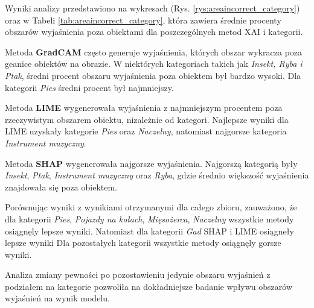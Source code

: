 Wyniki analizy  przedstawiono na wykresach (Rys. \ref{rys:areaincorrect_category}) oraz w Tabeli \ref{tab:areaincorrect_category}, która zawiera średnie procenty obszarów wyjaśnienia poza obiektami dla poszczególnych metod XAI i kategorii.

Metoda \textbf{GradCAM} często generuje wyjaśnienia, których obszar wykracza poza geanice obiektów na obrazie.
W niektórych kategoriach takich jak \textit{Insekt, Ryba i Ptak}, średni procent obszaru wyjaśnienia poza obiektem był bardzo wysoki.
Dla kategorii \textit{Pies} średni procent był najmniejszy.

Metoda \textbf{LIME} wygenerowała wyjaśnienia z najmniejszym procentem poza rzeczywistym obszarem obiektu, nizależnie od kategori.
Najlepsze wyniki dla LIME uzyskały kategorie \textit{Pies} oraz \textit{Naczelny}, natomiast najgorsze kategoria \textit{Instrument muzyczny}.

Metoda \textbf{SHAP} wygenerowała najgorsze wyjaśnienia.
Najgorszą kategorią były \textit{Insekt}, \textit{Ptak}, \textit{Instrument muzyczny} oraz \textit{Ryba}, gdzie średnio większość wyjaśnienia znajdowała się poza obiektem.

Porównując wyniki z wynikiami otrzymanymi dla całego zbioru, zauważono, że dla kategorii \textit{Pies}, \textit{Pojazdy na kołach}, \textit{Mięsożerca}, \textit{Naczelny} wszystkie metody osiągnęly lepsze wyniki.
Natomiast dla kategorii \textit{Gad} SHAP i LIME osiągneły lepsze wyniki
Dla pozostałych kategorii wszystkie metody osiągnęly gorsze wyniki.

\vspace{1cm}

Analiza zmiany pewności po pozostawieniu jedynie obszaru wyjaśnień z podziałem na kategorie pozwoliła na dokładniejsze badanie wpływu obszarów wyjaśnień na wynik modelu.

